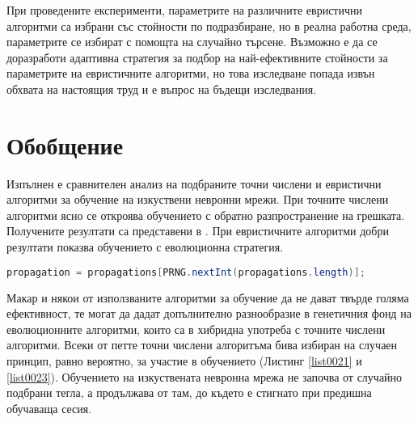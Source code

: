 При проведените експерименти, параметрите на различните евристични алгоритми са избрани със стойности по подразбиране, но в реална работна среда, параметрите се избират с помощта на случайно търсене. Възможно е да се доразработи адаптивна стратегия за подбор на най-ефективните стойности за параметрите на евристичните алгоритми, но това изследване попада извън обхвата на настоящия труд и е въпрос на бъдещи изследвания. 

\section{Обобщение}

Изпълнен е сравнителен анализ на подбраните точни числени и евристични алгоритми за обучение на изкуствени невронни мрежи. При точните числени алгоритми ясно се откроява обучението с обратно разпространение на грешката. Получените резултати са представени в \cite{Tomov-08}. При евристичните алгоритми добри резултати показва обучението с еволюционна стратегия.

\begin{lstlisting}[caption=Случаен избор на точните числени алгоритми, language=Java, basicstyle=\tiny, label=list0023]
propagation = propagations[PRNG.nextInt(propagations.length)];
\end{lstlisting}

Макар и някои от използваните алгоритми за обучение да не дават твърде голяма ефективност, те могат да дадат допълнително разнообразие в генетичния фонд на еволюционните алгоритми, които са в хибридна употреба с точните числени алгоритми. Всеки от петте точни числени алгоритъма бива избиран на случаен принцип, равно вероятно, за участие в обучението (Листинг \ref{list0021} и \ref{list0023}). Обучението на изкуствената невронна мрежа не започва от случайно подбрани тегла, а продължава от там, до където е стигнато при предишна обучаваща сесия. 


